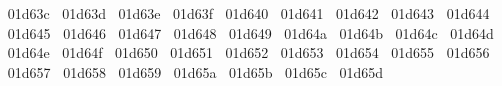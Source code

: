 {  ^^^^^^01d63c%
  ^^^^^^01d63d%
  ^^^^^^01d63e%
  ^^^^^^01d63f%
  ^^^^^^01d640%
  ^^^^^^01d641%
  ^^^^^^01d642%
  ^^^^^^01d643%
  ^^^^^^01d644%
  ^^^^^^01d645%
  ^^^^^^01d646%
  ^^^^^^01d647%
  ^^^^^^01d648%
  ^^^^^^01d649%
  ^^^^^^01d64a%
  ^^^^^^01d64b%
  ^^^^^^01d64c%
  ^^^^^^01d64d%
  ^^^^^^01d64e%
  ^^^^^^01d64f%
  ^^^^^^01d650%
  ^^^^^^01d651%
  ^^^^^^01d652%
  ^^^^^^01d653%
  ^^^^^^01d654%
  ^^^^^^01d655%
  ^^^^^^01d656%
  ^^^^^^01d657%
  ^^^^^^01d658%
  ^^^^^^01d659%
  ^^^^^^01d65a%
  ^^^^^^01d65b%
  ^^^^^^01d65c%
  ^^^^^^01d65d%
}
